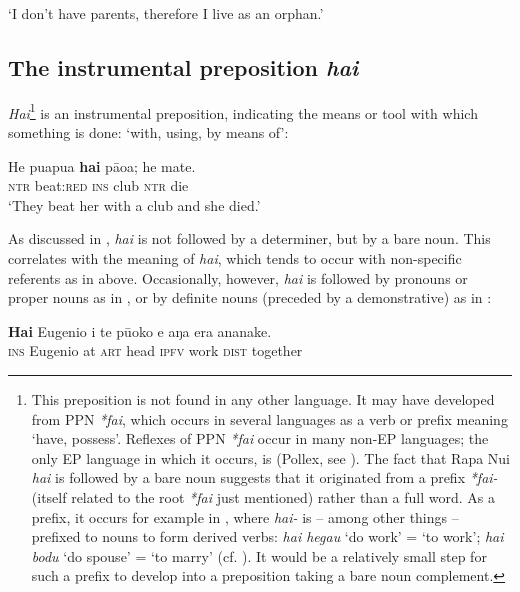 \glt 
‘I don’t have parents, therefore I live as an orphan.’ \textstyleExampleref{[R214.013]} 
\z
{}
\subsection{The instrumental preposition \textit{hai}}\label{sec:4.7.9}
\textit{Hai}\footnote{\label{fn:239}This preposition is not found in any other language. It may have developed from PPN \textit{*fai}, which occurs in several languages as a verb or prefix meaning ‘have, possess’. Reflexes of PPN \textit{*fai} occur in many non-EP languages; the only EP language in which it occurs, is  (Pollex, see \citealt{GreenhillClark2011}). The fact that Rapa Nui \textit{hai} is followed by a bare noun suggests that it originated from a prefix \textit{*fai-}  (itself related to the root \textit{*fai} just mentioned) rather than a full word. As a prefix, it occurs for example in , where \textit{hai-} is – among other things – prefixed to nouns to form derived verbs: \textit{hai hegau} ‘do work’ = ‘to work’; \textit{hai bodu} ‘do spouse’ = ‘to marry’ (cf. \citealt[628]{CarrollSoulik1973}). It would be a relatively small step for such a prefix to develop into a preposition taking a bare noun complement.} is an instrumental preposition, indicating the means or tool with which something is done: ‘with, using, by means of’:

\ea\label{ex:4.297}
\gll He pu{\ꞌ}apu{\ꞌ}a \textbf{hai} pāoa; he mate.\\
\textsc{ntr} beat:\textsc{red} \textsc{ins} club \textsc{ntr} die\\

\glt
‘They beat her with a club and she died.’ \textstyleExampleref{[Egt-01.082]}
\z

As discussed in , \textit{hai} is not followed by a determiner, but by a bare noun. This correlates with the meaning of \textit{hai}, which tends to occur with non-specific referents as in  above. Occasionally, however, \textit{hai} is followed by pronouns or proper nouns as in , or by definite nouns (preceded by a demonstrative) as in :

\ea\label{ex:4.298}
\gll \textbf{Hai} Eugenio {\ꞌ}i te pū{\ꞌ}oko e aŋa era ananake.\\
\textsc{ins} Eugenio at \textsc{art} head \textsc{ipfv} work \textsc{dist} together\\

